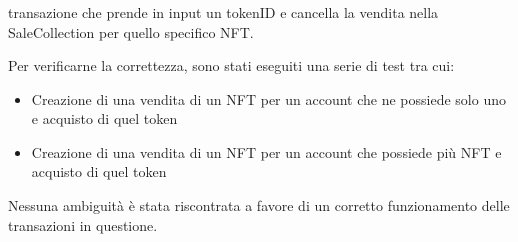 \subsubsection*{}transazione che prende in input un tokenID e cancella la vendita nella SaleCollection per quello specifico NFT.

Per verificarne la correttezza, sono stati eseguiti una serie di test tra cui:
\begin{itemize}
    \item Creazione di una vendita di un NFT per un account che ne possiede solo uno e acquisto di quel token
    \item Creazione di una vendita di un NFT per un account che possiede più NFT e acquisto di quel token
\end{itemize}
Nessuna ambiguità è stata riscontrata a favore di un corretto funzionamento delle
transazioni in questione.
